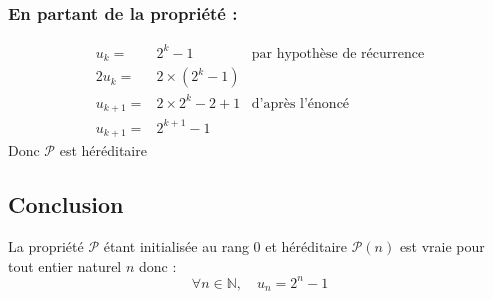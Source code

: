 \documentclass{exam}
\newcommand*{\p}{\mathcal{P}}
\newcommand*{\n}{\mathbb{N}}
\begin{document}
\subsubsection{En partant de la propriété :}
\begin{align*}
u_k=&2^k-1
&
\text{par hypothèse de récurrence}
\\
2u_k=&2\times\left(2^k-1\right)
\\
u_{k+1}=&2\times2^k-2+1
&
\text{d'après l'énoncé}
\\
u_{k+1}=&2^{k+1}-1
\end{align*}
Donc $\p$ est héréditaire
\subsection{Conclusion}
La propriété $\p$ étant initialisée au rang 0 et héréditaire $\p(n)$ est vraie pour
tout entier naturel $n$ donc :
$$
\forall n\in\n,
\quad
u_n=2^n-1
$$
\end{document}
